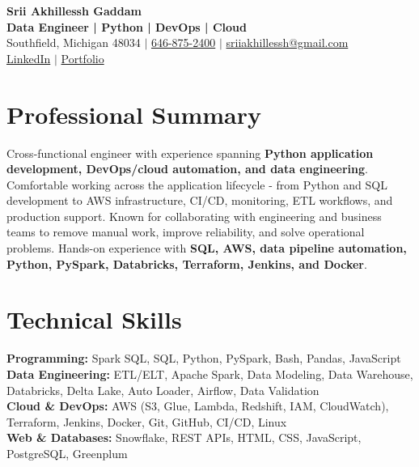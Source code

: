 \documentclass[letterpaper,10pt]{article}
\begin{document}
\fontsize{9.35pt}{10.45pt}\selectfont

\begin{center}
    {\LARGE \textbf{Srii Akhillessh Gaddam}} \\[-1pt]
    \textbf{Data Engineer | Python | DevOps | Cloud} \\[2pt]
    Southfield, Michigan 48034 $|$
    \href{tel:6468752400}{646-875-2400} $|$
    \href{mailto:sriiakhillessh@gmail.com}{sriiakhillessh@gmail.com} \\[1pt]
    \href{https://www.linkedin.com/in/srii-akhiilessh-gaddam-b48668191/}{LinkedIn} $|$
    \href{https://sriiakhillesshg.github.io/portfolio/}{Portfolio}
\end{center}
\vspace{-8pt}

\section{Professional Summary}
\small{Cross-functional engineer with experience spanning \textbf{Python application development, DevOps/cloud automation, and data engineering}. Comfortable working across the application lifecycle - from Python and SQL development to AWS infrastructure, CI/CD, monitoring, ETL workflows, and production support. Known for collaborating with engineering and business teams to remove manual work, improve reliability, and solve operational problems. Hands-on experience with \textbf{SQL, AWS, data pipeline automation, Python, PySpark, Databricks, Terraform, Jenkins, and Docker}.}

\section{Technical Skills}
\small{
\textbf{Programming:} Spark SQL, SQL, Python, PySpark, Bash, Pandas, JavaScript \\
\textbf{Data Engineering:} ETL/ELT, Apache Spark, Data Modeling, Data Warehouse, Databricks, Delta Lake, Auto Loader, Airflow, Data Validation \\
\textbf{Cloud \& DevOps:} AWS (S3, Glue, Lambda, Redshift, IAM, CloudWatch), Terraform, Jenkins, Docker, Git, GitHub, CI/CD, Linux \\
\textbf{Web \& Databases:} Snowflake, REST APIs, HTML, CSS, JavaScript, PostgreSQL, Greenplum
}
\end{document}
